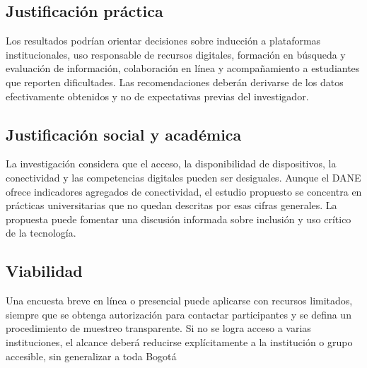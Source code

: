 \subsection{Justificación práctica}
Los resultados podrían orientar decisiones sobre inducción a plataformas institucionales, uso responsable
de recursos digitales, formación en búsqueda y evaluación de información, colaboración en línea y
acompañamiento a estudiantes que reporten dificultades. Las recomendaciones deberán derivarse de los datos
efectivamente obtenidos y no de expectativas previas del investigador.
\subsection{Justificación social y académica}
La investigación considera que el acceso, la disponibilidad de dispositivos, la conectividad y las
competencias digitales pueden ser desiguales. Aunque el DANE ofrece indicadores agregados de conectividad, el
estudio propuesto se concentra en prácticas universitarias que no quedan descritas por esas cifras generales. La
propuesta puede fomentar una discusión informada sobre inclusión y uso crítico de la tecnología.
\subsection{Viabilidad}
Una encuesta breve en línea o presencial puede aplicarse con recursos limitados, siempre que se obtenga
autorización para contactar participantes y se defina un procedimiento de muestreo transparente. Si no se logra
acceso a varias instituciones, el alcance deberá reducirse explícitamente a la institución o grupo accesible, sin
generalizar a toda Bogotá

